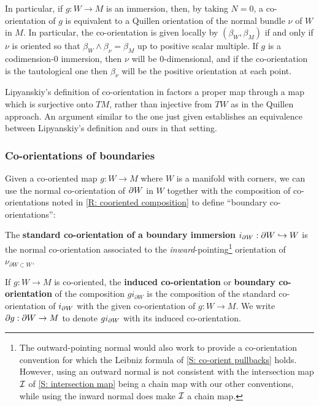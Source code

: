 \begin{remark}\label{R: immersion}
In particular, if $g: W\to M$ is an immersion, then, by taking $N=0$, a co-orientation of $g$ is equivalent to a Quillen orientation of the normal bundle
  $\nu$  of $W$ in $M$. In particular, the co-orientation is given locally by $(\beta_W,\beta_M)$ if and only if $\nu$ is oriented so that $\beta_W\wedge \beta_\nu=
\beta_M$ up to positive scalar multiple. If $g$ is a codimension-$0$ immersion, then $\nu$ will be $0$-dimensional, and if the co-orientation is the tautological one then $\beta_\nu$ will be the positive orientation at each point.
\end{remark}


\begin{remark}
Lipyanskiy's definition of co-orientation in \cite{Lipy14} factors a proper map through a map which is surjective onto $TM$,
rather than injective from $TW$ as in the Quillen approach.
An argument similar to the one just given establishes an equivalence between Lipyanskiy's definition and ours in that setting. 
\end{remark}




\subsubsection{Co-orientations of boundaries}
Given a co-oriented map $g:W\to M$ where $W$ is a manifold with corners, we can use the normal co-orientation of $\partial W$ in $W$ together with the composition of co-orientations noted in \cref{R: cooriented composition} to define ``boundary co-orientations'':

\begin{definition}\label{D: boundary co-orientation}
The {\bf standard co-orientation of a boundary immersion}
 $i_{\partial W}:\partial W \hookrightarrow W$ is the normal co-orientation associated to the \textit{inward}-pointing\footnote{The outward-pointing normal would also work to provide a co-orientation convention for which the Leibniz formula of \cref{S: co-orient pullbacks} holds. However, using an outward normal is not consistent with the intersection map $\mathcal{I}$ of \cref{S: intersection map} being a chain map with our other conventions, while using the inward normal does make $\mathcal{I}$ a chain map.}
orientation of $\nu_{\partial W \subset W}$.

If $g : W \to M$ is co-oriented, the {\bf induced co-orientation} or {\bf boundary co-orientation} of the composition $gi_{\partial W}$ is the composition of the standard co-orientation of $i_{\partial W}$ with the given co-orientation of $g:W\to M$. We write $\partial g:\partial W\to M$ to denote $gi_{\partial W}$ with its induced co-orientation.
\end{definition}

